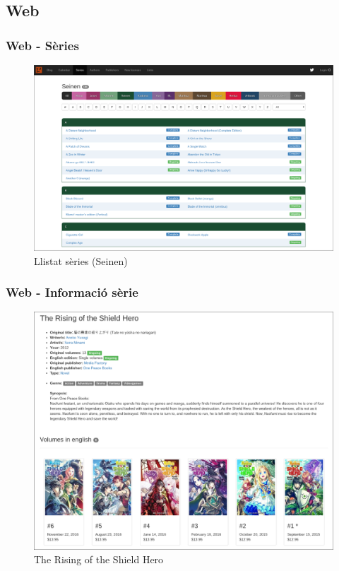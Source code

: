 \documentclass{beamer}
\begin{document}

	\begin{frame}
		\section{Web}
	\end{frame}

	\begin{frame}
	\frametitle{Web - Sèries}
		\begin{figure}
			\centering
			\includegraphics[width=1\textwidth]{series.png}
			\caption{Llistat sèries (Seinen)}
		\end{figure}
	\end{frame}

	\begin{frame}
	\frametitle{Web - Informació sèrie}
		\begin{figure}
			\centering
			\includegraphics[scale=0.20]{shield.png}
			\caption{The Rising of the Shield Hero}
		\end{figure}
	\end{frame}
\end{document}
